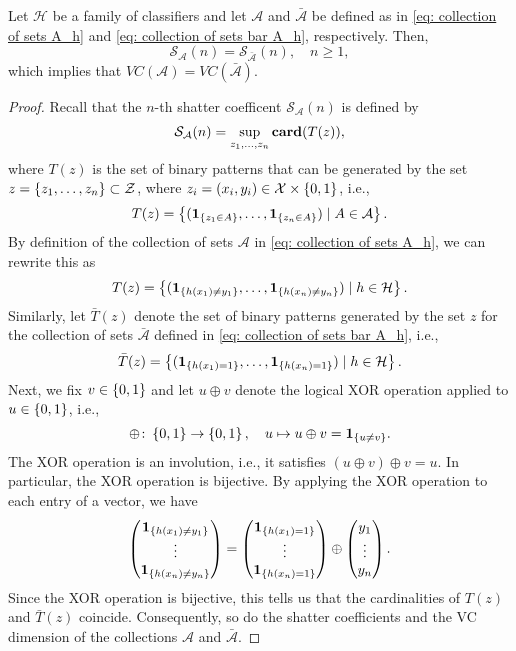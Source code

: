 \begin{theorem}
Let $\mathcal{H}$ be a family of classifiers and let $\mathcal{A}$ and $\bar{\mathcal{A}}$ be defined as in \eqref{eq: collection of sets A_h} and \eqref{eq: collection of sets bar A_h}, respectively. Then,
\[
    \mathcal{S}_{\mathcal{A}}(n) = \mathcal{S}_{\bar{\mathcal{A}}}(n), \quad n \geq 1,
\]
which implies that $VC(\mathcal{A}) = VC(\bar{\mathcal{A}})$.
\end{theorem}

\begin{proof}
Recall that the $n$-th shatter coefficent $\mathcal{S}_{\mathcal{A}}(n)$ is defined by
\[
    \mathcal{S}_{\mathcal{A}}(n) = \sup_{z_1, \dots, z_n} \mathrm{\mathbf{card}}(T(z)),
\]
where $T(z)$ is the set of binary patterns that can be generated by the set $z = \left\{z_1, \dots, z_n\right\} \subset \mathcal{Z}$, where $z_i = (x_i, y_i) \in \mathcal{X} \times \left\{0, 1\right\}$, i.e.,
\[
    T(z) = \left\{(\mathbf{1}_{\left\{z_1 \in A\right\}}, \dots, \mathbf{1}_{\left\{z_n \in A\right\}}) \mathrel{|} A \in \mathcal{A}\right\}.
\]
By definition of the collection of sets $\mathcal{A}$ in \eqref{eq: collection of sets A_h}, we can rewrite this as
\[
    T(z) = \left\{(\mathbf{1}_{\left\{h(x_1) \neq y_1\right\}}, \dots, \mathbf{1}_{\left\{h(x_n) \neq y_n\right\}}) \mathrel{|} h \in \mathcal{H}\right\}.
\]
Similarly, let $\bar T(z)$ denote the set of binary patterns generated by the set $z$ for the collection of sets $\bar{\mathcal{A}}$ defined in \eqref{eq: collection of sets bar A_h}, i.e.,
\[
    \bar T(z) = \left\{(\mathbf{1}_{\left\{h(x_1) = 1\right\}}, \dots, \mathbf{1}_{\left\{h(x_n) = 1\right\}}) \mathrel{|} h \in \mathcal{H}\right\}.
\]
Next, we fix $v \in \left\{0, 1\right\}$ and let $u \oplus v$ denote the logical XOR operation applied to $u \in \left\{0, 1\right\}$, i.e.,
\[
    \oplus \colon \left\{0, 1\right\} \to \left\{0, 1\right\}, \quad u \mapsto u \oplus v = \mathbf{1}_{\left\{u \neq v\right\}}.
\]
The XOR operation is an involution, i.e., it satisfies $(u \oplus v) \oplus v = u$. In particular, the XOR operation is bijective. By applying the XOR operation to each entry of a vector, we have
\[
    \begin{pmatrix}
        \mathbf{1}_{\left\{h(x_1) \neq y_1\right\}} \\
        \vdots \\
        \mathbf{1}_{\left\{h(x_n) \neq y_n\right\}}
    \end{pmatrix} =
    \begin{pmatrix}
        \mathbf{1}_{\left\{h(x_1) = 1\right\}} \\
        \vdots \\
        \mathbf{1}_{\left\{h(x_n) = 1\right\}}
    \end{pmatrix} \oplus
    \begin{pmatrix}
        y_1 \\
        \vdots \\
        y_n
    \end{pmatrix}.
\]
Since the XOR operation is bijective, this tells us that the cardinalities of $T(z)$ and $\bar T(z)$ coincide. Consequently, so do the shatter coefficients and the VC dimension of the collections $\mathcal{A}$ and $\bar{\mathcal{A}}$.
\end{proof}

